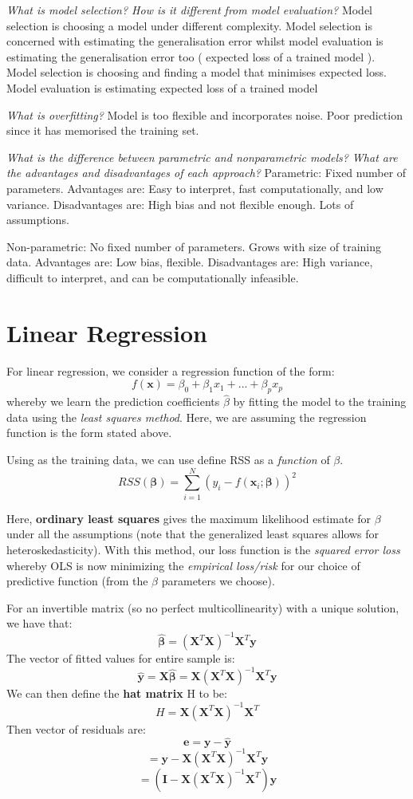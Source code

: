\documentclass[11pt, oneside]{article}
\def\dataset{\text{$\{(y_i, {\bm{x_i}})\}_{i=1}^N$}}
\theoremstyle{definition}
\begin{document}
\textit{What is model selection? How is it different from model evaluation?}
Model selection is choosing a model under different complexity. Model selection is concerned with estimating the generalisation error whilst model evaluation is estimating the generalisation error too ( expected loss of a trained model ). Model selection is choosing and finding a model that minimises expected loss. Model evaluation is estimating expected loss of a trained model

\textit{What is overfitting?}
Model is too flexible and incorporates noise. Poor prediction since it has memorised the training set.

\textit{What is the difference between parametric and nonparametric models? What are the advantages and disadvantages of each approach?}
Parametric: Fixed number of parameters. Advantages are: Easy to interpret, fast computationally, and low variance. Disadvantages are: High bias and not flexible enough. Lots of assumptions.

Non-parametric: No fixed number of parameters. Grows with size of training data. Advantages are: Low bias, flexible. Disadvantages are: High variance, difficult to interpret, and can be computationally infeasible.

\newpage
\section{Linear Regression}
For linear regression, we consider a regression function of the form:
$$
f(\bm{x}) = \beta_0 + \beta_1x_1 + ... + \beta_px_p
$$
whereby we learn the prediction coefficients $\hat{\beta}$ by fitting the model to the training data using the \textit{least squares method}. Here, we are assuming the regression function is the form stated above.

Using \dataset as the training data, we can use define RSS as a \textit{function} of $\beta$.
$$
RSS(\bm{\beta}) = \sum\limits_{i=1}^N(y_i - f(\bm{x}_i;\bm{\beta}))^2
$$

Here, \textbf{ordinary least squares} gives the maximum likelihood estimate for $\beta$ under all the assumptions (note that the generalized least squares allows for heteroskedasticity). With this method, our loss function is the \textit{squared error loss} whereby OLS is now minimizing the \textit{empirical loss/risk} for our choice of predictive function (from the $\beta$ parameters we choose).

For an invertible matrix (so no perfect multicollinearity) with a unique solution, we have that:
$$
\hat{\bm{\beta}} = (\bm{X}^T\bm{X})^{-1}\bm{X}^T\bm{y}
$$
The vector of fitted values for entire sample is:
$$
\hat{\bm{y}} = \bm{X}\hat{\bm{\beta}} = \bm{X}(\bm{X}^T\bm{X})^{-1}\bm{X}^T\bm{y}
$$
We can then define the \textbf{hat matrix} H to be:
$$
H = \bm{X}(\bm{X}^T\bm{X})^{-1}\bm{X}^T
$$
Then vector of residuals are:
$$
\bm{e} = \bm{y} - \hat{\bm{y}}
$$
$$
= \bm{y} - \bm{X}(\bm{X}^T\bm{X})^{-1}\bm{X}^T\bm{y}
$$
$$
= (\bm{I} - \bm{X}(\bm{X}^T\bm{X})^{-1}\bm{X}^T)\bm{y}
$$
\end{document}
